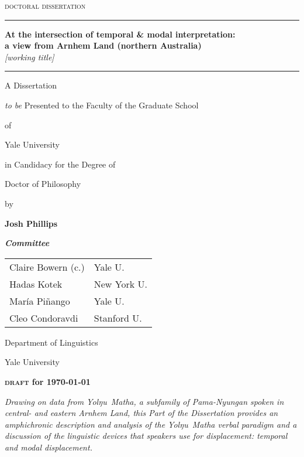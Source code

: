 \documentclass[11pt]{report}
\date{}
\newcommand{\HRule}{\rule{\linewidth}{0.5mm}}
\begin{document}
	
	\begin{center}
	\thispagestyle{empty}
	{\Large	\textsc{doctoral dissertation}}
	\vfill
	\HRule\vspace{.33cm}
	
	\setcounter{page}{-1}
	\textbf{{\huge At the intersection of temporal \& modal interpretation:}\\
		{\Large a view from Arnhem Land (northern Australia)}}\\\textit{[working title]}
	
	\HRule
	\vfill
\normalsize	A Dissertation

\textit{to be }Presented to the Faculty of the Graduate School

of

Yale University

in Candidacy for the Degree of 

Doctor of Philosophy
	\vfill
	{\small by
		
		\textbf{Josh Phillips}}
	\vfill
	\textit{\textbf{Committee}}\\
	\begin{tabular}{ll}
		Claire Bowern (c.) & Yale U.\\
		Hadas Kotek & New York U.\\
		María Piñango & Yale U.\\
		Cleo Condoravdi & Stanford U.\\
	\end{tabular}
	
	
	
	\vfill
	\sc Department of Linguistics
	
	Yale University
	
	\textbf{\textsc{draft} for \today}
	
	
\end{center}\newpage
	


\vspace*{\fill}
\sl Drawing on data from Yolŋu~Matha, a subfamily of Pama-Nyungan spoken in central- and eastern Arnhem Land, this Part of the Dissertation provides an amphichronic description and analysis of the Yolŋu~Matha verbal paradigm and a discussion of the linguistic devices that speakers use for displacement: temporal and modal displacement.
\end{document}
